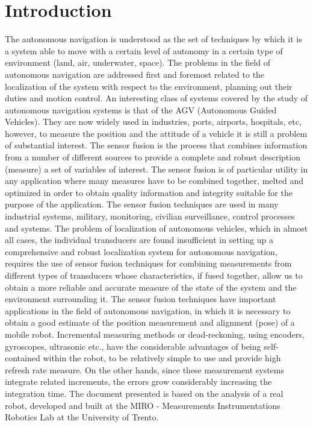 \section{Introduction}
The autonomous navigation is understood as the set of techniques by which it is a system able to move with a certain level of autonomy in a certain type of environment (land, air, underwater, space). The problems in the field of autonomous navigation are addressed first and foremost related to the localization of the system with respect to the environment, planning out their duties and motion control.
An interesting class of systems covered by the study of autonomous navigation systems is that of the AGV (Autonomous Guided Vehicles). They are now widely used in industries, ports, airports, hospitals, etc, however, to measure the position and the attitude of a vehicle it is still a problem of substantial interest.
The sensor fusion is the process that combines information from a number of different sources to provide a complete and robust description (measure) a set of variables of interest. The sensor fusion is of particular utility in any application where many measures have to be combined together, melted and optimized in order to obtain quality information and integrity suitable for the purpose of the application. The sensor fusion techniques are used in many industrial systems, military, monitoring, civilian surveillance, control processes and systems. The problem of localization of autonomous vehicles, which in almost all cases, the individual transducers are found insufficient in setting up a comprehensive and robust localization system for autonomous navigation, requires the use of sensor fusion techniques for combining measurements from different types of transducers whose characteristics, if fused together, allow us to obtain a more reliable and accurate measure of the state of the system and the environment surrounding it.
The sensor fusion techniques have important applications in the field of autonomous navigation, in which it is necessary to obtain a good estimate of the position measurement and alignment (pose) of a mobile robot. Incremental measuring methods or dead-reckoning, using encoders, gyroscopes, ultrasonic etc., have the considerable advantages of being self-contained within the robot, to be relatively simple to use and provide high refresh rate measure. On the other hands, since these measurement systems integrate related increments, the errors grow considerably increasing the integration time.
The document presented is based on the analysis of a real robot, developed and built at the MIRO - Measurements Instrumentations Robotics Lab at the University of Trento.
